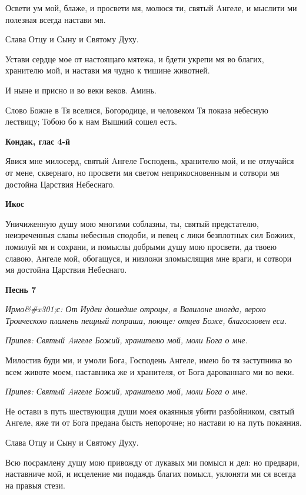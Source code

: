 Освети ум мой, блаже, и просвети мя, молюся ти, святый Aнгеле, и мыслити ми полезная всегда настави мя.


Слава Отцу и Сыну и Святому Духу.


Устави сердце мое от настоящаго мятежа, и бдети укрепи мя во благих, хранителю мой, и настави мя чудно к тишине животней.


И ныне и присно и во веки веков. Аминь.


Слово Божие в Тя вселися, Богородице, и человеком Тя показа небесную лествицу; Тобою бо к нам Вышний сошел есть.




\bfseries Кондак, глас 4-й\normalfont{}


Явися мне милосерд, святый Aнгеле Господень, хранителю мой, и не отлучайся от мене, сквернаго, но просвети мя светом неприкосновенным и сотвори мя достойна Царствия Небеснаго.




\bfseries Икос\normalfont{}


Уничиженную душу мою многими соблазны, ты, святый предстателю, неизреченныя славы небесныя сподоби, и певец с лики безплотных сил Божиих, помилуй мя и сохрани, и помыслы добрыми душу мою просвети, да твоею славою, Aнгеле мой, обогащуся, и низложи зломыслящия мне враги, и сотвори мя достойна Царствия Небеснаго.




\bfseries Песнь 7\normalfont{}


\itshape Ирмо&#x301;с:\normalfont{} От Иудеи дошедше отроцы, в Вавилоне иногда, верою Троическою пламень пещный попраша, поюще: отцев Боже, благословен еси.


\itshape Припев:\normalfont{} Святый Aнгеле Божий, хранителю мой, моли Бога о мне.


Милостив буди ми, и умоли Бога, Господень Aнгеле, имею бо тя заступника во всем животе моем, наставника же и хранителя, от Бога дарованнаго ми во веки.


\itshape Припев:\normalfont{} Святый Aнгеле Божий, хранителю мой, моли Бога о мне.


Не остави в путь шествующия души моея окаянныя убити разбойником, святый Aнгеле, яже ти от Бога предана бысть непорочне; но настави ю на путь покаяния.


Слава Отцу и Сыну и Святому Духу.


Всю посрамлену душу мою привожду от лукавых ми помысл и дел: но предвари, наставниче мой, и исцеление ми подаждь благих помысл, уклоняти ми ся всегда на правыя стези.


